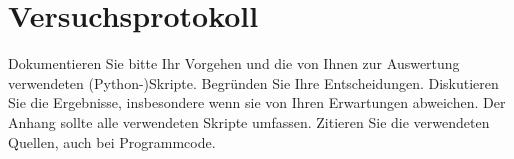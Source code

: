 \section{Versuchsprotokoll}

Dokumentieren Sie bitte Ihr Vorgehen und die von Ihnen zur Auswertung verwendeten (Python-)Skripte. Begründen Sie Ihre Entscheidungen. Diskutieren Sie die Ergebnisse, insbesondere wenn sie von Ihren Erwartungen abweichen. Der Anhang sollte alle verwendeten Skripte umfassen. Zitieren Sie die verwendeten Quellen, auch bei Programmcode.
